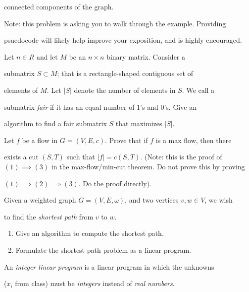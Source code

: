 \documentclass{article}
\begin{document}
connected components of the graph.



Note: this problem is asking you to walk through the example.  Providing

psuedocode will likely help improve your exposition, and is highly encouraged.



\nextprob

Let $n \in R$ and let $M$ be an $n \times n$ binary matrix.  Consider a

submatrix $S \subset M$; that is a rectangle-shaped contiguous set of

elements of $M$.  Let $|S|$ denote the number of elements in $S$.  We call a

submatrix \emph{fair} if it has an equal number of $1$'s and $0$'s.  Give an

algorithm to find a fair submatrix $S$ that maximizes $|S|$.



\nextprob

Let $f$ be a flow in $G=(V,E,c)$.  Prove that if $f$ is a max flow, then there

exists a cut $(S,T)$ such that $|f| = c(S,T)$.  (Note: this is the proof of $(1)

\implies (3)$ in the max-flow/min-cut theorem.  Do not prove this by proving

$(1) \implies (2) \implies (3)$.  Do the proof directly).



\nextprob

Given a weighted graph $G=(V,E,\omega)$, and two vertices $v,w \in V$, we wish

to find the \emph{shortest path} from $v$ to $w$.



\begin{enumerate}

    \item Give an algorithm to compute the shortest path.

    \item Formulate the shortest path problem as a linear program.

\end{enumerate}



\nextprob

An \emph{integer linear program} is a linear program in which the unknowns

($x_i$ from class) must be \emph{integers} instead of \emph{real numbers}.
\end{document}
